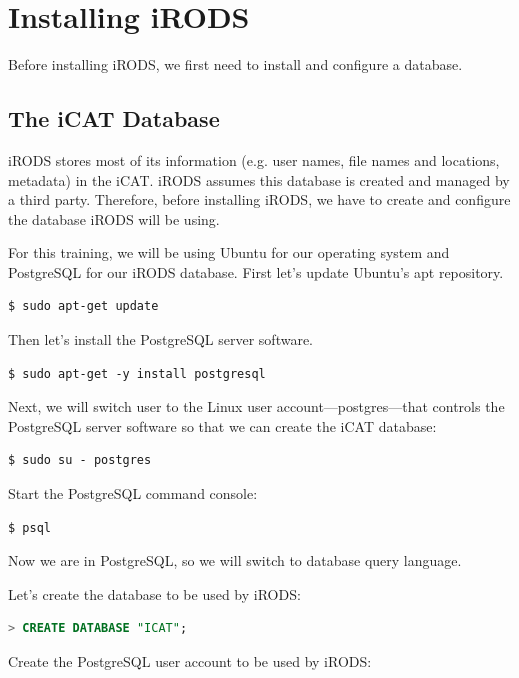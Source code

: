 \documentclass[10pt,oneside]{memoir}
\begin{document}
\chapter{Installing iRODS}

Before installing iRODS, we first need to install and configure a database.

\section{The iCAT Database}
iRODS stores most of its information (e.g. user names, file names and locations, metadata) in the iCAT. iRODS assumes this database is created and managed by a third party. Therefore, before installing iRODS, we have to create and configure the database iRODS will be using.


For this training, we will be using Ubuntu for our operating system and PostgreSQL for our iRODS database. First let's update Ubuntu's apt repository.

\begin{lstlisting}
$ sudo apt-get update
\end{lstlisting}

Then let's install the PostgreSQL server software.

\begin{lstlisting}
$ sudo apt-get -y install postgresql
\end{lstlisting}

Next, we will switch user to the Linux user account---postgres---that controls the PostgreSQL server software so that we can create the iCAT database:

\begin{lstlisting}
$ sudo su - postgres
\end{lstlisting}

Start the PostgreSQL command console:

\begin{lstlisting}
$ psql
\end{lstlisting}

\newpage

Now we are in PostgreSQL, so we will switch to database query language.

Let's create the database to be used by iRODS:

\begin{lstlisting}[language=sql]
> CREATE DATABASE "ICAT";
\end{lstlisting}

Create the PostgreSQL user account to be used by iRODS:
\end{document}
